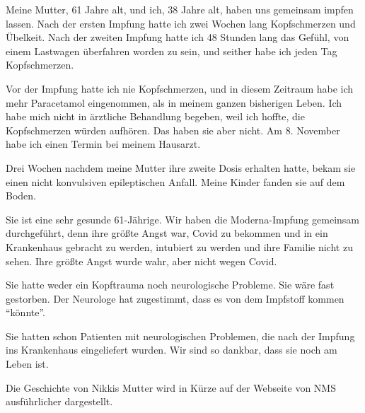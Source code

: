 Meine Mutter, 61 Jahre alt, und ich, 38 Jahre alt, haben uns gemeinsam impfen
lassen. Nach der ersten Impfung hatte ich zwei Wochen lang Kopfschmerzen und
Übelkeit. Nach der zweiten Impfung hatte ich 48 Stunden lang das Gefühl, von
einem Lastwagen überfahren worden zu sein, und seither habe ich jeden Tag
Kopfschmerzen.

Vor der Impfung hatte ich nie Kopfschmerzen, und in diesem Zeitraum habe ich
mehr Paracetamol eingenommen, als in meinem ganzen bisherigen Leben. Ich habe
mich nicht in ärztliche Behandlung begeben, weil ich hoffte, die Kopfschmerzen
würden aufhören. Das haben sie aber nicht. Am 8. November habe ich einen Termin
bei meinem Hausarzt.

Drei Wochen nachdem meine Mutter ihre zweite Dosis erhalten hatte, bekam sie
einen nicht konvulsiven epileptischen Anfall. Meine Kinder fanden sie auf dem
Boden.

Sie ist eine sehr gesunde 61-Jährige. Wir haben die Moderna-Impfung gemeinsam
durchgeführt, denn ihre größte Angst war, Covid zu bekommen und in ein
Krankenhaus gebracht zu werden, intubiert zu werden und ihre Familie nicht zu
sehen. Ihre größte Angst wurde wahr, aber nicht wegen Covid.

Sie hatte weder ein Kopftrauma noch neurologische Probleme. Sie wäre fast
gestorben. Der Neurologe hat zugestimmt, dass es von dem Impfstoff kommen
``könnte''.

Sie hatten schon Patienten mit neurologischen Problemen, die nach der Impfung
ins Krankenhaus eingeliefert wurden. Wir sind so dankbar, dass sie noch am Leben
ist.

Die Geschichte von Nikkis Mutter wird in Kürze auf der Webseite von NMS
ausführlicher dargestellt.
